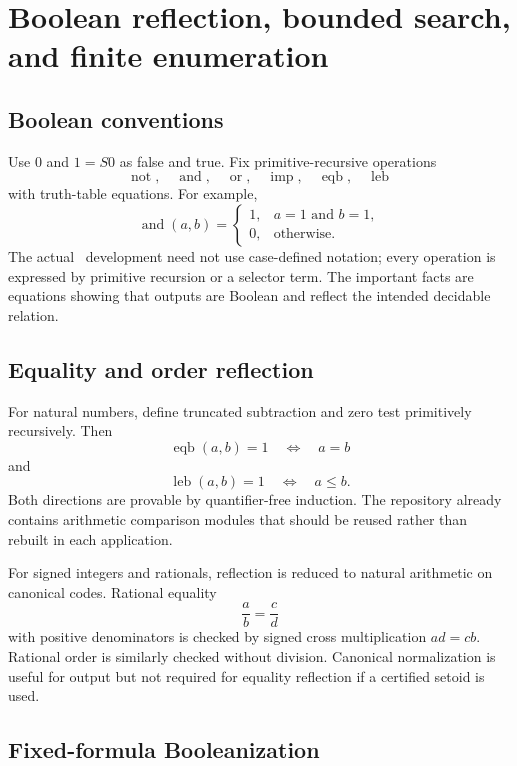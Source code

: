 \section{Boolean reflection, bounded search, and finite enumeration}

\subsection{Boolean conventions}

Use \(0\) and \(1=S0\) as false and true.  Fix primitive-recursive operations
\[
 \operatorname{not},\quad \operatorname{and},\quad \operatorname{or},\quad
 \operatorname{imp},\quad \operatorname{eqb},\quad \operatorname{leb}
\]
with truth-table equations.  For example,
\[
 \operatorname{and}(a,b)=
 \begin{cases}
 1,&a=1\text{ and }b=1,\\
 0,&\text{otherwise}.
 \end{cases}
\]
The actual \iPRA\ development need not use case-defined notation; every operation is expressed by primitive recursion or a selector term.  The important facts are equations showing that outputs are Boolean and reflect the intended decidable relation.

\subsection{Equality and order reflection}

For natural numbers, define truncated subtraction and zero test primitively recursively.  Then
\[
 \operatorname{eqb}(a,b)=1
 \quad\Longleftrightarrow\quad a=b
\]
and
\[
 \operatorname{leb}(a,b)=1
 \quad\Longleftrightarrow\quad a\le b.
\]
Both directions are provable by quantifier-free induction.  The repository already contains arithmetic comparison modules that should be reused rather than rebuilt in each application.

For signed integers and rationals, reflection is reduced to natural arithmetic on canonical codes.  Rational equality
\[
 \frac{a}{b}=\frac{c}{d}
\]
with positive denominators is checked by signed cross multiplication \(ad=cb\).  Rational order is similarly checked without division.  Canonical normalization is useful for output but not required for equality reflection if a certified setoid is used.

\subsection{Fixed-formula Booleanization}

